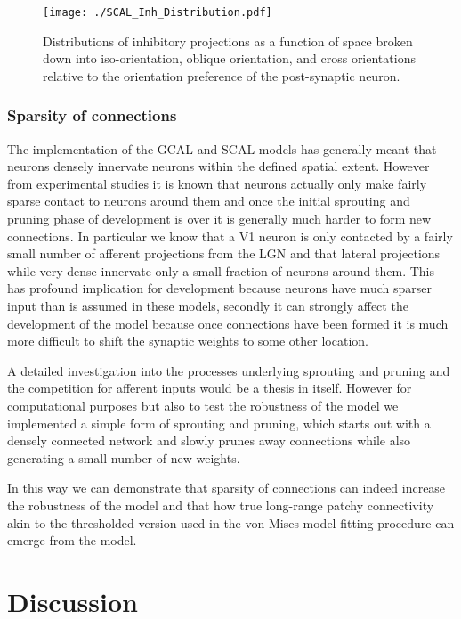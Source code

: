 \begin{figure}
	\centering
        \texttt{[image: ./SCAL\_Inh\_Distribution.pdf]}
	\caption[Spatial and orientation distribution of the lateral
      inhibitory weights in SCAL.]{Distributions of inhibitory
      projections as a function of space broken down into
      iso-orientation, oblique orientation, and cross orientations
      relative to the orientation preference of the post-synaptic
      neuron.}
	\label{LatDist}
\end{figure}

\subsubsection{Sparsity of connections}

The implementation of the GCAL and SCAL models has generally meant
that neurons densely innervate neurons within the defined spatial
extent. However from experimental studies it is known that neurons
actually only make fairly sparse contact to neurons around them and
once the initial sprouting and pruning phase of development is over it
is generally much harder to form new connections. In particular we
know that a V1 neuron is only contacted by a fairly small number of
afferent projections from the LGN and that lateral projections while
very dense innervate only a small fraction of neurons around
them. This has profound implication for development because neurons
have much sparser input than is assumed in these models, secondly it
can strongly affect the development of the model because once
connections have been formed it is much more difficult to shift the
synaptic weights to some other location.

A detailed investigation into the processes underlying sprouting and
pruning and the competition for afferent inputs would be a thesis in
itself. However for computational purposes but also to test the
robustness of the model we implemented a simple form of sprouting and
pruning, which starts out with a densely connected network and slowly
prunes away connections while also generating a small number of new
weights.

In this way we can demonstrate that sparsity of connections can indeed
increase the robustness of the model and that how true long-range
patchy connectivity akin to the thresholded version used in the von
Mises model fitting procedure can emerge from the model.

\section{Discussion}

